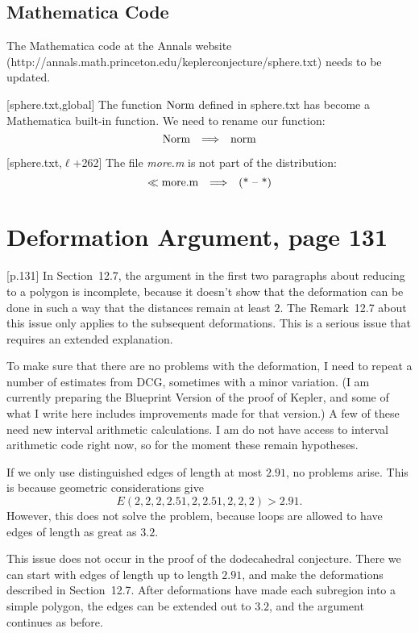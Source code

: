 \documentclass[11pt]{amsart}
\def\op#1{{\text{#1}}}
\def\to{{\quad\Longrightarrow\quad}}
\def\line{$\ell$}
\def\text{\hbox}
\begin{document}
\subsection{Mathematica Code}

The Mathematica code at the Annals website
(http://annals.math.princeton.edu/keplerconjecture/sphere.txt) needs to be updated.

[sphere.txt,global]
The function $\op{Norm}$ defined in sphere.txt
has become a Mathematica built-in function.
We need to rename our function: 
	$$\op{Norm} \to \op{norm}$$
	
[sphere.txt,\line+262]
The file {\it more.m} is not part of the distribution:
	$$\ll \op{more.m} \to \op{(* -- *)}$$




\section{Deformation Argument, page 131}

[p.131]
In Section~12.7, the argument in the first two
paragraphs about reducing to a polygon is incomplete, because it doesn't show that the deformation can be done in such a way that the distances remain at least $2$.  The Remark~12.7 about this issue only applies to the subsequent 
deformations.  This is a serious issue that requires an extended explanation.

To make sure that there are no problems with the deformation,
I need to repeat a number of estimates from DCG, sometimes with
a minor variation.  (I am currently preparing the Blueprint
Version of the proof of Kepler, and some of what I write here
includes improvements made for that version.)  A few of
these need new interval arithmetic calculations.  I am
do not have access to interval arithmetic code right now, so for the moment these remain hypotheses.


If we only use distinguished edges of length
at most $2.91$, no problems arise.  This is
because geometric considerations give
  $$E(2,2,2,2.51,2,2.51,2,2,2) > 2.91.$$
However, this does not solve the problem, because
loops are allowed to have edges of length as
great as $3.2$.

This issue does not occur in the proof of the dodecahedral conjecture.  There we can start with edges of length up to length $2.91$, and make the deformations described in Section~12.7.  After deformations have made each subregion into a simple polygon, the edges can be extended out to $3.2$, and the argument continues as before.
\end{document}
